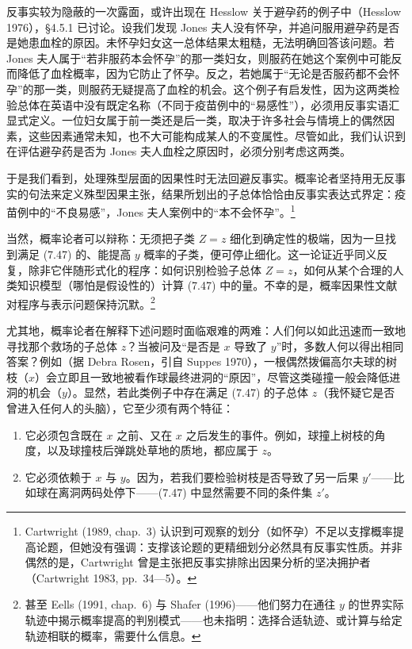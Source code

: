 反事实较为隐蔽的一次露面，或许出现在 Hesslow 关于避孕药的例子中（Hesslow 1976），\S 4.5.1 已讨论。设我们发现 Jones 夫人没有怀孕，并追问服用避孕药是否是她患血栓的原因。未怀孕妇女这一总体结果太粗糙，无法明确回答该问题。若 Jones 夫人属于“若非服药本会怀孕”的那一类妇女，则服药在她这个案例中可能反而降低了血栓概率，因为它防止了怀孕。反之，若她属于“无论是否服药都不会怀孕”的那一类，则服药无疑提高了血栓的机会。这个例子有启发性，因为这两类检验总体在英语中没有既定名称（不同于疫苗例中的“易感性”），必须用反事实语汇显式定义。一位妇女属于前一类还是后一类，取决于许多社会与情境上的偶然因素，这些因素通常未知，也不大可能构成某人的不变属性。尽管如此，我们认识到在评估避孕药是否为 Jones 夫人血栓之原因时，必须分别考虑这两类。

于是我们看到，处理殊型层面的因果性时无法回避反事实。概率论者坚持用无反事实的句法来定义殊型因果主张，结果所划出的子总体恰恰由反事实表达式界定：疫苗例中的“不良易感”，Jones 夫人案例中的“本不会怀孕”。\footnote{Cartwright (1989, chap.~3) 认识到可观察的划分（如怀孕）不足以支撑概率提高论题，但她没有强调：支撑该论题的更精细划分必然具有反事实性质。并非偶然的是，Cartwright 曾是主张把反事实排除出因果分析的坚决拥护者（Cartwright 1983, pp.~34—5）。}

当然，概率论者可以辩称：无须把子类 $Z=z$ 细化到确定性的极端，因为一旦找到满足 \textup{(7.47)} 的、能提高 $y$ 概率的子类，便可停止细化。这一论证近乎同义反复，除非它伴随形式化的程序：如何识别检验子总体 $Z=z$，如何从某个合理的人类知识模型（哪怕是假设性的）计算 \textup{(7.47)} 中的量。不幸的是，概率因果性文献对程序与表示问题保持沉默。\footnote{甚至 Eells (1991, chap.~6) 与 Shafer (1996)——他们努力在通往 $y$ 的世界实际轨迹中揭示概率提高的判别模式——也未指明：选择合适轨迹、或计算与给定轨迹相联的概率，需要什么信息。}

尤其地，概率论者在解释下述问题时面临艰难的两难：人们何以如此迅速而一致地寻找那个救场的子总体 $z$？当被问及“是否是 $x$ 导致了 $y$”时，多数人何以得出相同答案？例如（据 Debra Rosen，引自 Suppes 1970），一根偶然拨偏高尔夫球的树枝（$x$）会立即且一致地被看作球最终进洞的“原因”，尽管这类碰撞一般会降低进洞的机会（$y$）。显然，若此类例子中存在满足 \textup{(7.47)} 的子总体 $z$（我怀疑它是否曾进入任何人的头脑），它至少须有两个特征：
\begin{enumerate}[label=(\arabic*),leftmargin=2.2em]
\item 它必须包含既在 $x$ 之前、又在 $x$ 之后发生的事件。例如，球撞上树枝的角度，以及球撞枝后弹跳处草地的质地，都应属于 $z$。
\item 它必须依赖于 $x$ 与 $y$。因为，若我们要检验树枝是否导致了另一后果 $y'$——比如球在离洞两码处停下——\textup{(7.47)} 中显然需要不同的条件集 $z'$。
\end{enumerate}

